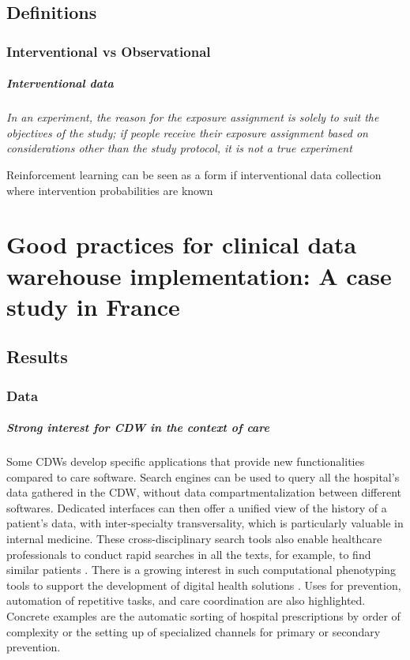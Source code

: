\documentclass{report}
\begin{document}
\section{Definitions}

\subsection{Interventional vs Observational}

\paragraph{Interventional data}

\textit{In an experiment, the reason for the exposure assignment is solely to
  suit the objectives of the study; if people receive their exposure assignment
  based on considerations other than the study protocol, it is not a true
  experiment} \citep{rothman2012epidemiology}

Reinforcement learning can be seen as a form if
interventional data collection where intervention probabilities are known
\cite{bareinboim2015bandits}


\chapter{Good practices for clinical data warehouse implementation: A case study
  in France}\label{chap:good_practices}


\section{Results}\label{sec:good_practices:results}
\subsection{Data}\label{subsec:good_practices:results:data}

\paragraph{Strong interest for CDW in the context of care}

Some CDWs develop specific applications that provide new functionalities
compared to care software. Search engines can be used to query all the
hospital's data gathered in the CDW, without data compartmentalization between
different softwares. Dedicated interfaces can then offer a unified view of the
history of a patient's data, with inter-specialty transversality, which is
particularly valuable in internal medicine. These cross-disciplinary search
tools also enable healthcare professionals to conduct rapid searches in all the
texts, for example, to find similar patients \citep{garcelon2017finding}.
%
There is a growing interest in such computational phenotyping tools to support
the development of digital health solutions \citep{wen2023impact}.
%
Uses for prevention, automation of repetitive tasks, and care coordination are
also highlighted. Concrete examples are the automatic sorting of hospital
prescriptions by order of complexity or the setting up of specialized channels
for primary or secondary prevention.
\end{document}

